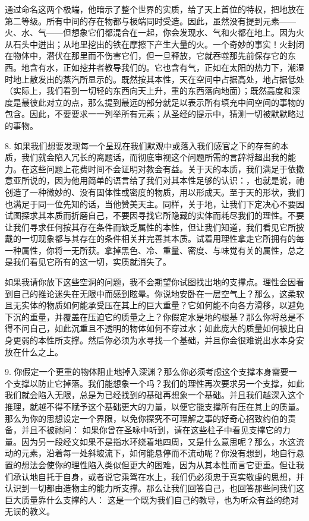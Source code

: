 通过命名这两个极端，他暗示了整个世界的实质，给了天上首位的特权，把地放在第二等级。所有中间的存在物都与极端同时受造。因此，虽然没有提到元素——火、水、气——但想象它们都混合在一起，你会发现水、气和火都在地上。因为火从石头中迸出；从地里挖出的铁在摩擦下产生大量的火。一个奇妙的事实！火封闭在物体中，潜伏在那里而不伤害它们，但一旦释放，它就吞噬那先前保存它的东西。地含有水，正如挖井者教导我们的。它也含有气，正如在太阳的热力下，潮湿时地上散发出的蒸汽所显示的。既然按其本性，天在空间中占据高处，地占据低处（实际上，我们看到一切轻的东西向天上升，重的东西落向地面）；既然高度和深度是最彼此对立的点，那么提到最远的部分就足以表示所有填充中间空间的事物的包含。因此，不要要求一一列举所有元素；从圣经的提示中，猜测一切被默默略过的事物。\par

8.  如果我们想要发现每一个呈现在我们默观中或落入我们感官之下的存有的本质，我们就会陷入冗长的离题话，而彻底审视这个问题所需的言辞将超出我的能力。在这些问题上花费时间不会证明对教会有益。关于天的本质，我们满足于依撒意亚所说的，因为他用简单的语言给了我们对其本性足够的认识：，也就是说，祂创造了一种微妙的、没有固体性或密度的物质，用以形成天。至于天的形状，我们也满足于同一位先知的话，当他赞美天主。同样，关于地，让我们下定决心不要因试图探求其本质而折磨自己，不要因寻找它所隐藏的实体而耗尽我们的理性。不要让我们寻求任何按其存在条件而缺乏属性的本性，但让我们知道，我们看见它所披戴的一切现象都与其存在的条件相关并完善其本质。试着用理性拿走它所拥有的每一种属性，你将一无所获。拿掉黑色、冷、重量、密度、与味觉有关的属性，总之是我们看见它所有的这一切，实质就消失了。\par

如果我请你放下这些空洞的问题，我不会期望你试图找出地的支撑点。理性会因看到自己的推论迷失在无限中而感到眩晕。你说地安卧在一层空气上？那么，这柔软且无实体的物质如何能承受压在其上的巨大重量？它如何能不向各方滑移，以避免下沉的重量，并覆盖在压迫它的质量之上？你假定水是地的根基？那么你将总是不得不问自己，如此沉重且不透明的物体如何不穿过水；如此庞大的质量如何被比自身更弱的本性所支撑。然后你必须为水寻找一个基础，并且你会很难说出水本身安放在什么之上。\par

9. 你假定一个更重的物体阻止地掉入深渊？那么你必须考虑这个支撑本身需要一个支撑以防止它掉落。我们能想象一个吗？我们的理性再次要求另一个支撑，如此我们就会陷入无限，总是为已经找到的基础再想象一个基础。并且我们越深入这个推理，就越不得不赋予这个基础更大的力量，以便它能支撑所有压在其上的质量。那么为你的思想设定一个界限，以免你探究不可理解之事的好奇心招致约伯的责备，并且不被祂问：  如果你曾在圣咏中听到，请在这些柱子中看见支撑它的力量。因为另一段经文如果不是指水环绕着地四周，又是什么意思呢？那么，水这流动的元素，沿着每一处斜坡流下，如何能悬停而不流动呢？你没有想到，地自行悬置的想法会使你的理性陷入类似但更大的困难，因为从其本性而言它更重。但让我们承认地自托于自身，或者说它乘驾在水上，我们仍必须忠于真实敬虔的思想，并认识到一切都由造物主的能力所支撑。那么让我们回答自己，也回答那些问我们这巨大质量靠什么支撑的人： 这是一个既为我们自己的教导，也为听众有益的绝对无误的教义。\par

